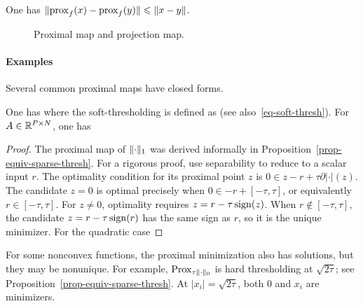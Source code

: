 \begin{prop}
	One has $\lVert \operatorname{prox}_{f}(x)-\operatorname{prox}_{f}(y) \rVert \leqslant \lVert x-y\rVert$.
\end{prop}



\begin{figure}[tbp]
\centering
{}
\caption{Proximal map and projection map.}
\label{fig-prox-proj}
\end{figure}


\paragraph{Examples}

Several common proximal maps have closed forms.

\begin{prop}
One has
where the soft-thresholding is defined as
(see also~\eqref{eq-soft-thresh}). For $A \in \mathbb{R}^{P \times N}$, one has
\end{prop}
\begin{proof}
	The proximal map of $\lVert\cdot\rVert_1$ was derived informally in Proposition~\ref{prop-equiv-sparse-thresh}.
	For a rigorous proof, use separability to reduce to a scalar input $r$. The optimality condition for its proximal point $z$ is $0 \in z-r + \tau \partial |\cdot|(z)$.
	The candidate $z=0$ is optimal precisely when $0 \in -r + [-\tau,\tau]$, or equivalently $r \in [-\tau,\tau]$.
	For $z \neq 0$, optimality requires $z = r - \tau \operatorname{sign}(z)$. When $r \notin [-\tau,\tau]$,
	the candidate $z = r - \tau \operatorname{sign}(r)$ has the same sign as $r$, so it is the unique minimizer.
	For the quadratic case
\end{proof}


For some nonconvex functions, the proximal minimization also has solutions, but they may be nonunique. For example,
$\operatorname{Prox}_{\tau \lVert\cdot\rVert_0}$ is hard thresholding at $\sqrt{2\tau}$; see Proposition~\ref{prop-equiv-sparse-thresh}. At $|x_i|=\sqrt{2\tau}$, both $0$ and $x_i$ are minimizers.


